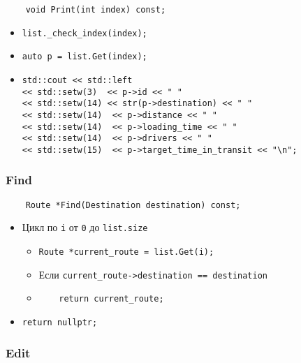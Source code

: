 \begin{lstlisting}
    void Print(int index) const;
\end{lstlisting}

\begin{itemize}
    \item \verb|list._check_index(index);|
    \item \verb|auto p = list.Get(index);|
    \item \verb|std::cout << std::left|\\
          \verb|<< std::setw(3)  << p->id << " "|\\
          \verb|<< std::setw(14) << str(p->destination) << " "|\\
          \verb|<< std::setw(14)  << p->distance << " "|\\
          \verb|<< std::setw(14)  << p->loading_time << " "|\\
          \verb|<< std::setw(14)  << p->drivers << " "|\\
          \verb|<< std::setw(15)  << p->target_time_in_transit << "\n";|
\end{itemize}

\subsubsection{Find}

\begin{lstlisting}
    Route *Find(Destination destination) const;
\end{lstlisting}

\begin{itemize}
    \item Цикл по \verb|i| от \verb|0| до \verb|list.size| 
        \begin{itemize}
            \item \verb|Route *current_route = list.Get(i);|
            \item Если \verb|current_route->destination == destination|
            \item \verb|    return current_route;|
        \end{itemize}
    \item \verb|return nullptr;|
\end{itemize}

\subsubsection{Edit}

